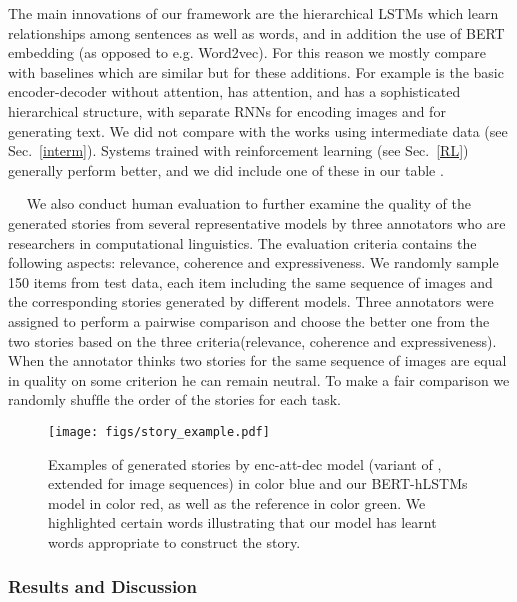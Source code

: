 \documentclass[a4paper,fleqn]{cas-sc}
\begin{document}
The main innovations of our framework are the hierarchical LSTMs which learn relationships among sentences as well as words, and in addition the use of BERT embedding (as opposed to e.g. Word2vec). 
For this reason we mostly compare with baselines which are similar but for these additions. For example \citet{Vinyals2014Show} is the basic encoder-decoder without attention, \citet{Xu2015Show} has attention, and \citet{Yulicheng2017} has a  sophisticated hierarchical structure, with separate RNNs for encoding images and for generating text. We did not compare with the works using intermediate data (see Sec.~\ref{interm}). Systems trained with reinforcement learning (see Sec.~\ref{RL}) generally perform better, and we did include one of these in our table \citep{wang-etal-2018-metrics}. 


~~
 We also conduct human evaluation to further examine the quality of the generated stories from several representative models by three annotators who are researchers in computational linguistics. The evaluation criteria contains the following aspects: relevance, coherence and expressiveness. We randomly sample 150 items from test data, each item including the same sequence of images and the corresponding stories generated by different models. Three annotators were assigned to perform a pairwise comparison and choose the better one from the two stories based on the three criteria(relevance, coherence and expressiveness). When the annotator thinks two stories for the same sequence of images are equal in quality on some criterion he can remain neutral. To make a fair comparison we randomly shufﬂe the order of the stories for each task. 
 
\begin{figure}[pos=!ht]
\centering
\texttt{[image: figs/story\_example.pdf]}
\caption{Examples of generated stories by enc-att-dec model (variant of \citet{Xu2015Show}, extended for image sequences) in color blue and our BERT-hLSTMs model in color red, as well as the reference in color green. We highlighted certain words illustrating that our model has learnt words appropriate to construct the story.
}
\label{FIG:story example}
\end{figure}

\subsubsection{Results and Discussion}
\end{document}
